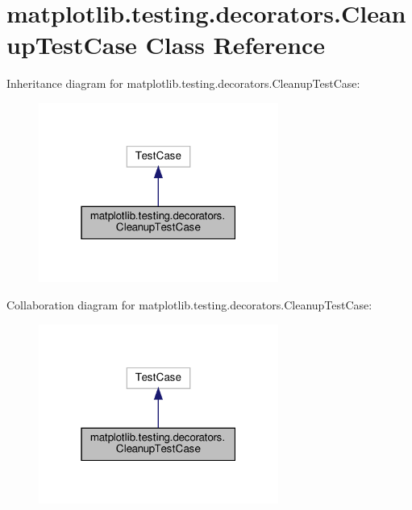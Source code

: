 \hypertarget{classmatplotlib_1_1testing_1_1decorators_1_1CleanupTestCase}{}\section{matplotlib.\+testing.\+decorators.\+Cleanup\+Test\+Case Class Reference}
\label{classmatplotlib_1_1testing_1_1decorators_1_1CleanupTestCase}


Inheritance diagram for matplotlib.\+testing.\+decorators.\+Cleanup\+Test\+Case\+:
\nopagebreak
\begin{figure}[H]
\begin{center}
\leavevmode
\includegraphics[width=223pt]{classmatplotlib_1_1testing_1_1decorators_1_1CleanupTestCase__inherit__graph}
\end{center}
\end{figure}


Collaboration diagram for matplotlib.\+testing.\+decorators.\+Cleanup\+Test\+Case\+:
\nopagebreak
\begin{figure}[H]
\begin{center}
\leavevmode
\includegraphics[width=223pt]{classmatplotlib_1_1testing_1_1decorators_1_1CleanupTestCase__coll__graph}
\end{center}
\end{figure}
